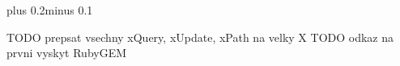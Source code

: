 \documentclass[11pt,twoside,a4paper]{book}
\begin{document}
\listoffigures



\listoftables



\mainbodystarts
\normalfont
{}\baselineskip plus 0.2\baselineskip minus 0.1\baselineskip



% 
% 



TODO prepsat vsechny xQuery, xUpdate, xPath na velky X
TODO odkaz na prvni vyskyt RubyGEM










\end{document}
